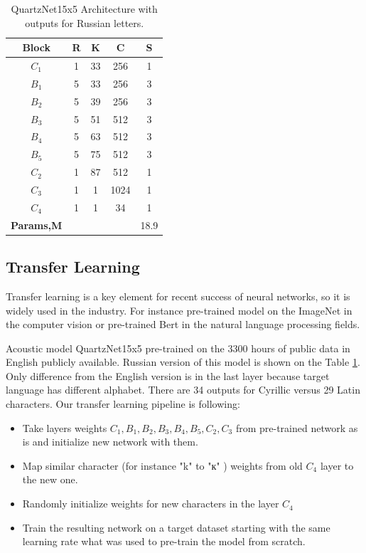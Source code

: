 \documentclass[a4paper]{article}
\begin{document}
\begin{table}[t]
  \caption{QuartzNet15x5 Architecture with outputs for Russian letters. }
  \label{tabular:Quartznet}
  \centering
  \begin{tabular}{ccccc}
    \toprule
    \textbf{Block}  & \textbf{R} & \textbf{K} & \textbf{C} & \textbf{S}     \\
    \midrule
    $C_1$  & 1 & 33 & 256 &  1  \\
    \midrule
    $B_1$  & 5 & 33 & 256 &  3  \\
    $B_2$  & 5 & 39 & 256 &  3  \\
    $B_3$  & 5 & 51 & 512 &  3  \\
    $B_4$  & 5 & 63 & 512 &  3  \\
    $B_5$  & 5 & 75 & 512 &  3  \\
    \midrule
    $C_2$  & 1 & 87 & 512 &  1  \\
    $C_3$  & 1 & 1 & 1024 &  1  \\
    $C_4$  & 1 & 1 & 34 &  1    \\
    \bottomrule
    \textbf{Params,M}  &  &  & &  18.9     \\
  \end{tabular}
\end{table}


\subsection{Transfer Learning}

Transfer learning is a key element for recent success of neural networks, so it is widely used in the industry. For instance pre-trained model on the ImageNet in the computer vision or pre-trained Bert in the natural language processing fields. 

Acoustic model QuartzNet15x5 pre-trained on the 3300 hours of public data in English publicly available. Russian version of this model is shown on the Table \ref{tabular:Quartznet}. Only difference from the English version is in the last layer because target language has different alphabet. There are 34 outputs for Cyrillic versus 29 Latin characters. Our transfer learning pipeline is following:
\begin{itemize}
    \item Take layers weights $C_1, B_1, B_2, B_3, B_4, B_5, C_2, C_3$ from pre-trained network as is and initialize new network with them.
    \item Map similar character (for instance "k"  to "к" ) weights from old $C_4$ layer to the new one.
    \item Randomly initialize weights for new characters in the layer $C_4$
    \item Train the resulting network on a target dataset starting with the same learning rate what was used to pre-train the model from scratch.
\end{itemize}
\end{document}
